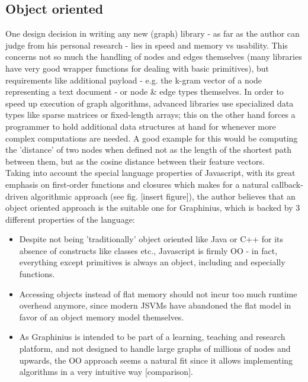 	\subsection{Object oriented}
	\label{ssect:oo}
	One design decision in writing any new (graph) library - as far as the author can judge from his personal research - lies in speed and memory vs usability. This concerns not so much the handling of nodes and edges themselves (many libraries have very good wrapper functions for dealing with basic primitives), but requirements like additional payload - e.g. the k-gram vector of a node representing a text document - or node \& edge types themselves. In order to speed up execution of graph algorithms, advanced libraries use specialized data types like sparse matrices or fixed-length arrays; this on the other hand forces a programmer to hold additional data structures at hand for whenever more complex computations are needed. A good example for this would be computing the 'distance' of two nodes when defined not as the length of the shortest path between them, but as the cosine distance between their feature vectors. \\
	
	Taking into account the special language properties of Javascript, with its great emphasis on first-order functions and closures which makes for a natural callback-driven algorithmic approach (see fig. [insert figure]), the author believes that an object oriented approach is the suitable one for Graphinius, which is backed by 3 different properties of the language:
	
	\begin{itemize}
		\item Despite not being 'traditionally' object oriented like Java or C++ for its absence of constructs like classes etc., Javascript is firmly OO - in fact, everything except primitives is always an object, including and especially functions.
		\item Accessing objects instead of flat memory should not incur too much runtime overhead anymore, since modern JSVMs have abandoned the flat model in favor of an object memory model themselves.
		\item As Graphinius is intended to be part of a learning, teaching and research platform, and not designed to handle large graphs of millions of nodes and upwards, the OO approach seems a natural fit since it allows implementing algorithms in a very intuitive way [comparison].
	\end{itemize}


